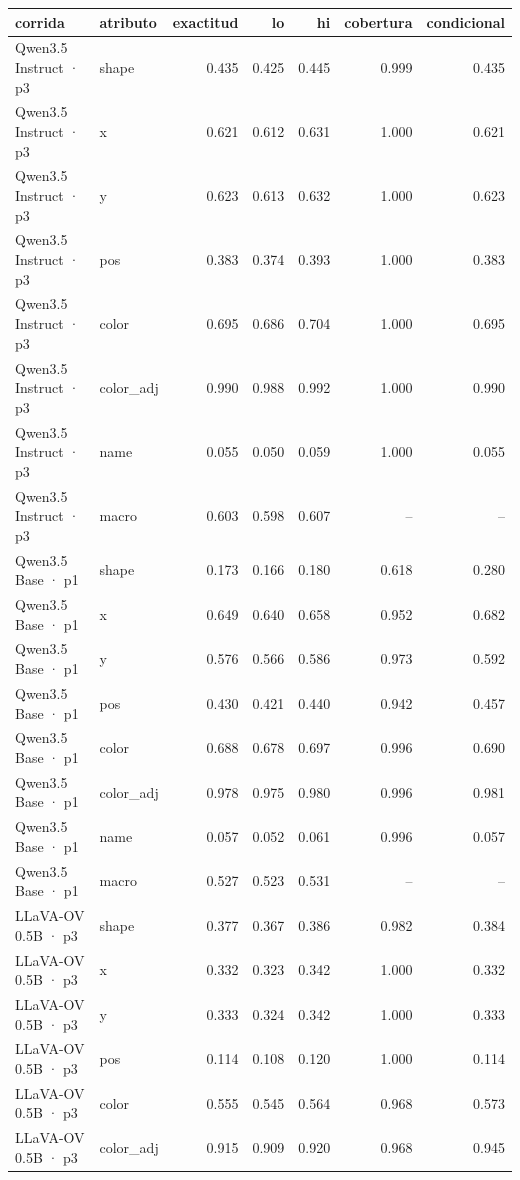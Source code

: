 \begin{tabular}{llrrrrr}
\toprule
corrida & atributo & exactitud & lo & hi & cobertura & condicional \\
\midrule
Qwen3.5 Instruct · p3 & shape & 0.435 & 0.425 & 0.445 & 0.999 & 0.435 \\
Qwen3.5 Instruct · p3 & x & 0.621 & 0.612 & 0.631 & 1.000 & 0.621 \\
Qwen3.5 Instruct · p3 & y & 0.623 & 0.613 & 0.632 & 1.000 & 0.623 \\
Qwen3.5 Instruct · p3 & pos & 0.383 & 0.374 & 0.393 & 1.000 & 0.383 \\
Qwen3.5 Instruct · p3 & color & 0.695 & 0.686 & 0.704 & 1.000 & 0.695 \\
Qwen3.5 Instruct · p3 & color\_adj & 0.990 & 0.988 & 0.992 & 1.000 & 0.990 \\
Qwen3.5 Instruct · p3 & name & 0.055 & 0.050 & 0.059 & 1.000 & 0.055 \\
Qwen3.5 Instruct · p3 & macro & 0.603 & 0.598 & 0.607 & -- & -- \\
Qwen3.5 Base · p1 & shape & 0.173 & 0.166 & 0.180 & 0.618 & 0.280 \\
Qwen3.5 Base · p1 & x & 0.649 & 0.640 & 0.658 & 0.952 & 0.682 \\
Qwen3.5 Base · p1 & y & 0.576 & 0.566 & 0.586 & 0.973 & 0.592 \\
Qwen3.5 Base · p1 & pos & 0.430 & 0.421 & 0.440 & 0.942 & 0.457 \\
Qwen3.5 Base · p1 & color & 0.688 & 0.678 & 0.697 & 0.996 & 0.690 \\
Qwen3.5 Base · p1 & color\_adj & 0.978 & 0.975 & 0.980 & 0.996 & 0.981 \\
Qwen3.5 Base · p1 & name & 0.057 & 0.052 & 0.061 & 0.996 & 0.057 \\
Qwen3.5 Base · p1 & macro & 0.527 & 0.523 & 0.531 & -- & -- \\
LLaVA-OV 0.5B · p3 & shape & 0.377 & 0.367 & 0.386 & 0.982 & 0.384 \\
LLaVA-OV 0.5B · p3 & x & 0.332 & 0.323 & 0.342 & 1.000 & 0.332 \\
LLaVA-OV 0.5B · p3 & y & 0.333 & 0.324 & 0.342 & 1.000 & 0.333 \\
LLaVA-OV 0.5B · p3 & pos & 0.114 & 0.108 & 0.120 & 1.000 & 0.114 \\
LLaVA-OV 0.5B · p3 & color & 0.555 & 0.545 & 0.564 & 0.968 & 0.573 \\
LLaVA-OV 0.5B · p3 & color\_adj & 0.915 & 0.909 & 0.920 & 0.968 & 0.945 \\

\end{tabular}
